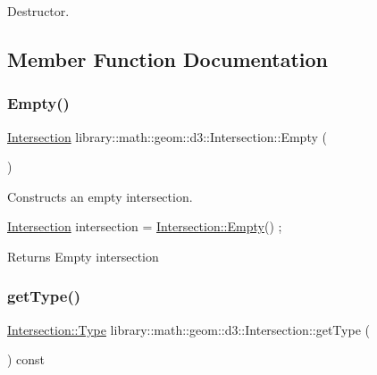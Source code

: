 Destructor. 



\subsection{Member Function Documentation}
\mbox{\label{classlibrary_1_1math_1_1geom_1_1d3_1_1_intersection_af0f1aed5c97a5142a4b20cb8edcb78e0}} 
\subsubsection{\texorpdfstring{Empty()}{Empty()}}
{\footnotesize\ttfamily \hyperlink{classlibrary_1_1math_1_1geom_1_1d3_1_1_intersection}{Intersection} library\+::math\+::geom\+::d3\+::\+Intersection\+::\+Empty (\begin{DoxyParamCaption}{ }\end{DoxyParamCaption})\hspace{0.3cm}{\ttfamily [static]}}



Constructs an empty intersection. 


\begin{DoxyCode}
\hyperlink{classlibrary_1_1math_1_1geom_1_1d3_1_1_intersection_ab800dbab95076a1d7ae47bd9d0887da3}{Intersection} intersection = \hyperlink{classlibrary_1_1math_1_1geom_1_1d3_1_1_intersection_af0f1aed5c97a5142a4b20cb8edcb78e0}{Intersection::Empty}() ;
\end{DoxyCode}


\begin{DoxyReturn}{Returns}
Empty intersection 
\end{DoxyReturn}
\mbox{\label{classlibrary_1_1math_1_1geom_1_1d3_1_1_intersection_aead6925dc35a2f6aec30373ca1556600}} 
\subsubsection{\texorpdfstring{get\+Type()}{getType()}}
{\footnotesize\ttfamily \hyperlink{classlibrary_1_1math_1_1geom_1_1d3_1_1_intersection_a3465d607fd42380f350598e055271b05}{Intersection\+::\+Type} library\+::math\+::geom\+::d3\+::\+Intersection\+::get\+Type (\begin{DoxyParamCaption}{ }\end{DoxyParamCaption}) const}



